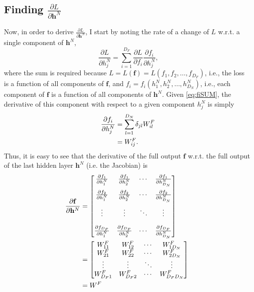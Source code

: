 \documentclass{article}
\begin{document}
\subsection{Finding \texorpdfstring{$\frac{\partial L}{\partial \mathbf{h}^N}$}{dL/dhN}}
\label{sec:dL/dhN}

Now, in order to derive $\frac{\partial L}{\partial \mathbf{h}^N}$, I start by noting the rate of a change of $L$ w.r.t. a single component of $\mathbf{h}^N$,
\begin{equation}
\label{eq:dL/dhN_j}
    \phantom{,}\frac{\partial L}{\partial h^N_j} = \displaystyle\sum_{i=1}^{D_F}\frac{\partial L}{\partial f_i}\frac{\partial f_i}{\partial h^N_j},
\end{equation}
where the sum is required because $L = L(\mathbf{f}) = L(f_1,f_2,\ldots,f_{D_F})$, i.e., the loss is a function of all components of $\mathbf{f}$, and $f_i = f_i(h^N_1,h^N_2,\ldots,h^N_{D_N})$, i.e., each component of $\mathbf{f}$ is a function of all components of $\mathbf{h}^N$. Given \cref{eq:fiSUM}, the derivative of this component with respect to a given component $h^N_j$ is simply
\begin{align}
\label{eq:df_i/dhN_j}
    \phantom{.}\frac{\partial f_i}{\partial h^N_j} &= \displaystyle\sum_{l=1}^{D_N}\delta_{jl}W^F_{il}\notag \\
    &= W^F_{ij}.
\end{align}
Thus, it is easy to see that the derivative of the full output $\mathbf{f}$ w.r.t. the full output of the last hidden layer $\mathbf{h}^N$ (i.e. the Jacobian) is
\begin{align}
    \frac{\partial \mathbf{f}}{\partial \mathbf{h}^N} &=
    \begin{bmatrix}
        \frac{\partial f_1}{\partial h^N_1} & \frac{\partial f_1}{\partial h^N_2} & \cdots & \frac{\partial f_1}{\partial h^N_{D_N}} \\[1em]
        \frac{\partial f_2}{\partial h^N_1} & \frac{\partial f_2}{\partial h^N_2} & \cdots & \frac{\partial f_2}{\partial h^N_{D_N}} \\[1em]
        \vdots & \vdots & \ddots & \vdots \\[1em]
        \frac{\partial f_{D_F}}{\partial h^N_1} & \frac{\partial f_{D_F}}{\partial h^N_2} & \cdots & \frac{\partial f_{D_F}}{\partial h^N_{D_N}}
    \end{bmatrix}\notag \\
    &=
    \begin{bmatrix}
        W^F_{11} & W^F_{12} & \cdots & W^F_{1D_N} \\
        W^F_{21} & W^F_{22} & \cdots & W^F_{2D_N} \\
        \vdots & \vdots & \ddots & \vdots \\
        W^F_{D_F 1} & W^F_{D_F 2} & \cdots & W^F_{D_F D_N}
    \end{bmatrix}\notag \\
    &= W^F
\end{align}
\end{document}
